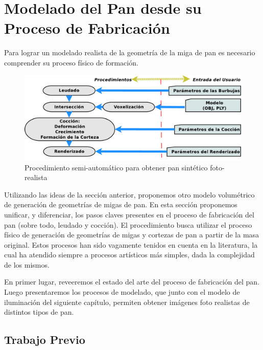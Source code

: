 \section{Modelado del Pan desde su Proceso de Fabricación}
Para lograr un modelado realista de la geometría de la miga de pan es necesario comprender su proceso físico de formación.

\begin{figure}
\includegraphics[width=13cm]{figures/pipeline}
\caption{Procedimiento semi-automático para obtener pan sintético foto-realista}
\label{FigPipeline}
\end{figure}

Utilizando las ideas de la sección anterior, proponemos otro modelo volumétrico de generación de geometrías de migas de pan.
En esta sección proponemos unificar, y diferenciar, los pasos claves presentes en el proceso de fabricación del pan (sobre todo, leudado y cocción).
El procedimiento busca utilizar el proceso físico de generación de geometrías de migas y cortezas de pan a partir de la masa original.
Estos procesos han sido vagamente tenidos en cuenta en la literatura, la cual ha atendido siempre a procesos artísticos más simples, dada la complejidad de los mismos.

En primer lugar, reveeremos el estado del arte del proceso de fabricación del pan.
Luego presentaremos los procesos de modelado, que junto con el modelo de iluminación del siguiente capítulo, permiten obtener imágenes foto realistas de distintos tipos de pan.

\subsection{Trabajo Previo}

